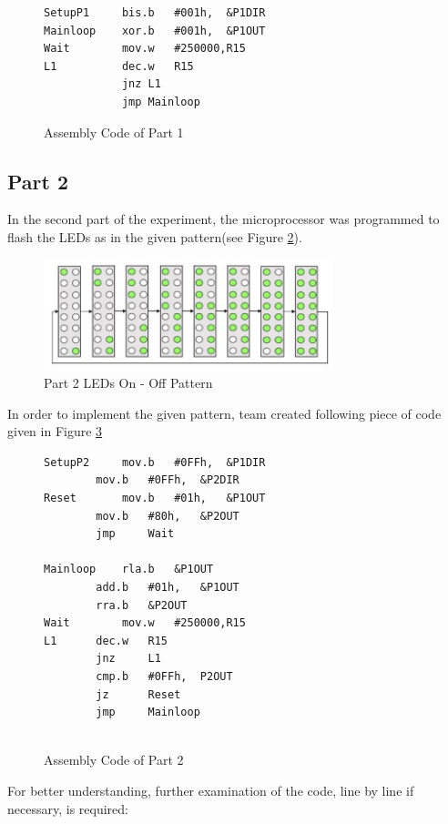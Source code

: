 \documentclass[pdftex,12pt,a4paper]{article}
\begin{document}
\begin{figure}[H]
    \centering
    \begin{lstlisting}[label={code:part1}]
SetupP1     bis.b   #001h,  &P1DIR 
Mainloop    xor.b   #001h,  &P1OUT 	 
Wait        mov.w   #250000,R15 	 
L1          dec.w   R15 			 
            jnz L1				 
            jmp Mainloop		 
    \end{lstlisting}
    \label{code:part1}
    \caption{Assembly Code of Part 1}
\end{figure}

\subsection{Part 2}
In the second part of the experiment, the microprocessor was programmed to flash the LEDs as in the given pattern(see Figure \ref{fig:part2}).

\begin{figure}[H]
    \centering
    \includegraphics[width=0.75\textwidth]{part2.png}
    \caption{Part 2 LEDs On - Off Pattern}
    \label{fig:part2}
\end{figure}

In order to implement the given pattern, team created following piece of code given in Figure \ref{code:part2}

\begin{figure}[H]
    \centering
    \begin{lstlisting}[language={[x86masm]Assembler}]
SetupP2		mov.b 	#0FFh,	&P1DIR 	 
		mov.b	#0FFh,	&P2DIR 	 
Reset		mov.b	#01h,	&P1OUT 	 
		mov.b	#80h,	&P2OUT 	 
		jmp 	Wait 			 

Mainloop	rla.b	&P1OUT 			 
		add.b 	#01h,	&P1OUT 	 
		rra.b	&P2OUT 			 
Wait		mov.w 	#250000,R15 	 
L1		dec.w	R15 			 
		jnz 	L1				 
		cmp.b	#0FFh, 	P2OUT	 
		jz      Reset    
		jmp 	Mainloop     
    
    \end{lstlisting}
    \label{code:part2}
    \caption{Assembly Code of Part 2}
\end{figure}

For better understanding, further examination of the code, line by line if necessary, is required:
\end{document}
